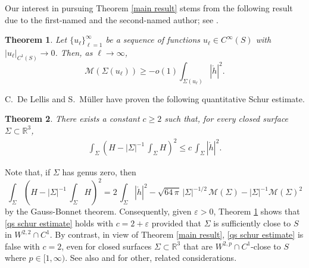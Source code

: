 \documentclass[11pt]{amsart}
\newtheorem{theorem}{Theorem}
\theoremstyle {definition}
\newcommand{\cM}{\mathcal{M}}
\begin{document}
Our interest in pursuing Theorem \ref{main result} stems from the following result due to the first-named and the second-named author; see \cite[Proposition E.4]{angstnomore}.
\begin{theorem}\label{W22 small almost Mink}
Let $\{u_\ell\}_{\ell=1}^\infty$ be a sequence   of functions $u_\ell \in C^\infty(S)$ with $|u_\ell|_{C^1(S)} \to0$. Then, as $\ell\to\infty$, 
\[
\cM(\Sigma(u_\ell)) \geq - o(1) \int_{\Sigma(u_\ell)} |\mathring{h}|^2 .
\]
\end{theorem}
C.\ De Lellis and S.\ M\"uller \cite[Theorem 1.1]{DeLellisMuller} have proven the following quantitative Schur estimate. \begin{theorem} There exists a constant $c\geq 2$ such that, for every closed surface $\Sigma\subset \mathbb{R}^3$,
\begin{align} \label{qs schur estimate}
	\int_{\Sigma}\left(H-|\Sigma|^{-1}\,\int_{\Sigma} H\right)^2\leq c\,\int_{\Sigma}|\mathring{h}|^2.
\end{align}
\end{theorem} 
Note that, if $\Sigma$ has genus zero, then
$$
\int_{\Sigma}\left(H-|\Sigma|^{-1}\,\int_{\Sigma} H\right)^2=2\,\int_\Sigma|\mathring{h}|^2-\sqrt{64\,\pi}\,|\Sigma|^{-1/2}\,\mathcal{M}(\Sigma)-|\Sigma|^{-1}\mathcal{M}(\Sigma)^2
$$
by the Gauss-Bonnet theorem. Consequently, given $\varepsilon>0$, Theorem \ref{W22 small almost Mink} shows that  \eqref{qs schur estimate} holds with $c=2+\varepsilon$ provided that $\Sigma$ is sufficiently close to $S$ in $W^{2,2}\cap C^1$. By contrast, in view of Theorem \ref{main result}, \eqref{qs schur estimate} is false with $c=2$, even for closed surfaces $\Sigma\subset\mathbb{R}^3$ that are $W^{2,p}\cap C^1$-close to $S$ where $p\in[1,\infty)$. See also \cite[Chapter 3]{Perez:thesis} and \cite{Glaudo} for other, related considerations. 
\end{document}
